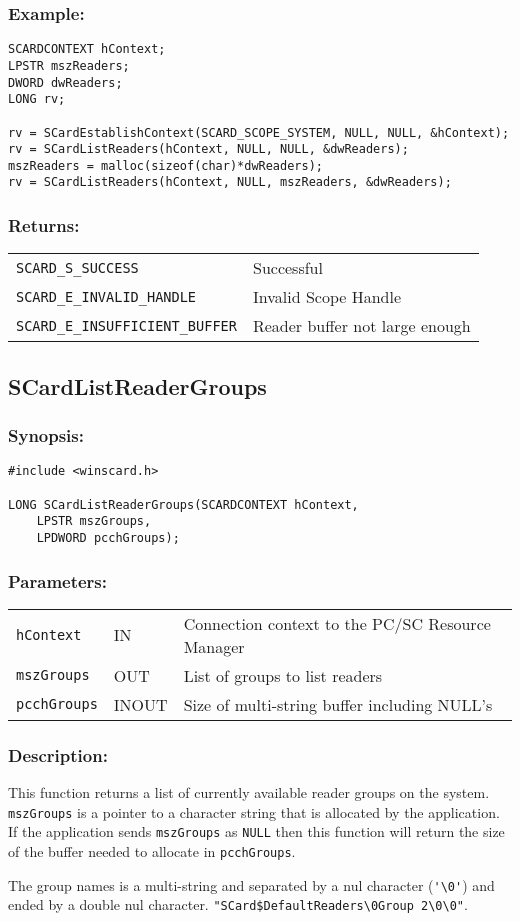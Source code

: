 \documentclass[a4paper,12pt]{article}
\newcommand{\synopsis}{\subsubsection{Synopsis:}}
\newcommand{\parameters}{\subsubsection{Parameters:}}
\newcommand{\desc}{\subsubsection{Description:}}
\newcommand{\example}{\subsubsection{Example:}}
\newcommand{\returns}{\subsubsection{Returns:}}
\begin{document}
\example
\begin{verbatim}
SCARDCONTEXT hContext;
LPSTR mszReaders;
DWORD dwReaders;
LONG rv;

rv = SCardEstablishContext(SCARD_SCOPE_SYSTEM, NULL, NULL, &hContext);
rv = SCardListReaders(hContext, NULL, NULL, &dwReaders);
mszReaders = malloc(sizeof(char)*dwReaders);
rv = SCardListReaders(hContext, NULL, mszReaders, &dwReaders);
\end{verbatim}

\returns

\begin{tabular}{ll}
\texttt{SCARD\_S\_SUCCESS} & Successful \\
\texttt{SCARD\_E\_INVALID\_HANDLE} & Invalid Scope Handle\\
\texttt{SCARD\_E\_INSUFFICIENT\_BUFFER} & Reader buffer not large enough
\end{tabular}


\subsection{SCardListReaderGroups}

\synopsis
\begin{verbatim}
#include <winscard.h>

LONG SCardListReaderGroups(SCARDCONTEXT hContext,
    LPSTR mszGroups,
    LPDWORD pcchGroups);
\end{verbatim}

\parameters

\begin{tabular}{lll}
\texttt{hContext} & IN & Connection context to the PC/SC Resource Manager\\
\texttt{mszGroups} & OUT & List of groups to list readers\\
\texttt{pcchGroups} & INOUT & Size of multi-string buffer including NULL's
\end{tabular}

\desc

This function returns a list of currently available reader groups on the
system. \texttt{mszGroups} is a pointer to a character string that is
allocated by the application. If the application sends
\texttt{mszGroups} as \texttt{NULL} then this function will return the
size of the buffer needed to allocate in \texttt{pcchGroups}.

The group names is a multi-string and separated by a nul character
(\verb+'\0'+) and ended by a double nul character.
\verb+"SCard$DefaultReaders\0Group 2\0\0"+.
\end{document}

